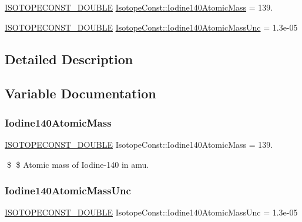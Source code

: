 \begin{DoxyCompactItemize}
\item 
\mbox{\hyperlink{group___isotope_const-_macros_ga8f45a7272ce02c0b4c65c44636ed719a}{I\+S\+O\+T\+O\+P\+E\+C\+O\+N\+S\+T\+\_\+\+D\+O\+U\+B\+LE}} \mbox{\hyperlink{group___isotope_const-_iodine-_i140_gabf4392c62ef6141345dd0e8e256f0d44}{Isotope\+Const\+::\+Iodine140\+Atomic\+Mass}} = 139.
\item 
\mbox{\hyperlink{group___isotope_const-_macros_ga8f45a7272ce02c0b4c65c44636ed719a}{I\+S\+O\+T\+O\+P\+E\+C\+O\+N\+S\+T\+\_\+\+D\+O\+U\+B\+LE}} \mbox{\hyperlink{group___isotope_const-_iodine-_i140_gad841b51c030f2d57002501b56907b3e1}{Isotope\+Const\+::\+Iodine140\+Atomic\+Mass\+Unc}} = 1.\+3e-\/05
\end{DoxyCompactItemize}


\subsection{Detailed Description}


\subsection{Variable Documentation}
\mbox{\label{group___isotope_const-_iodine-_i140_gabf4392c62ef6141345dd0e8e256f0d44}} 
\subsubsection{\texorpdfstring{Iodine140\+Atomic\+Mass}{Iodine140AtomicMass}}
{\footnotesize\ttfamily \mbox{\hyperlink{group___isotope_const-_macros_ga8f45a7272ce02c0b4c65c44636ed719a}{I\+S\+O\+T\+O\+P\+E\+C\+O\+N\+S\+T\+\_\+\+D\+O\+U\+B\+LE}} Isotope\+Const\+::\+Iodine140\+Atomic\+Mass = 139.}

\$ \$ Atomic mass of Iodine-\/140 in amu. \mbox{\label{group___isotope_const-_iodine-_i140_gad841b51c030f2d57002501b56907b3e1}} 
\subsubsection{\texorpdfstring{Iodine140\+Atomic\+Mass\+Unc}{Iodine140AtomicMassUnc}}
{\footnotesize\ttfamily \mbox{\hyperlink{group___isotope_const-_macros_ga8f45a7272ce02c0b4c65c44636ed719a}{I\+S\+O\+T\+O\+P\+E\+C\+O\+N\+S\+T\+\_\+\+D\+O\+U\+B\+LE}} Isotope\+Const\+::\+Iodine140\+Atomic\+Mass\+Unc = 1.\+3e-\/05}

